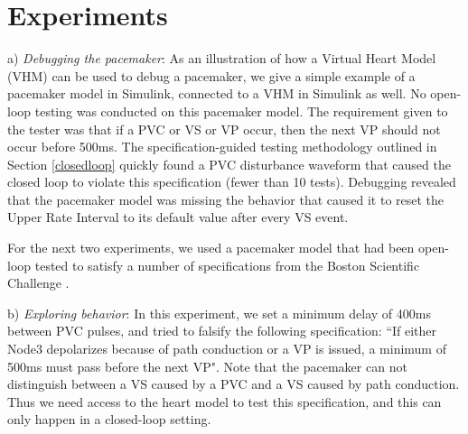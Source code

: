 \section{Experiments}
\label{experiments}

a) \emph{Debugging the pacemaker}: As an illustration of how a Virtual Heart Model (VHM) can be used to debug a pacemaker, we give a simple example of a pacemaker model in Simulink, connected to a VHM in Simulink as well. 
No open-loop testing was conducted on this pacemaker model.
The requirement given to the tester was that if a PVC or VS or VP occur, then the next VP should not occur before 500ms. 
The specification-guided testing methodology outlined in Section \ref{closedloop} quickly found a PVC disturbance waveform that caused the closed loop to violate this specification (fewer than 10 tests).
Debugging revealed that the pacemaker model was missing the behavior that caused it to reset the Upper Rate Interval to its default value after every VS event.

For the next two experiments, we used a pacemaker model that had been open-loop tested to satisfy a number of specifications from the Boston Scientific Challenge \cite{challenge}.

b) \emph{Exploring behavior}: In this experiment, we set a minimum delay of 400ms between PVC pulses, and tried to falsify the following specification:
``If either Node3 depolarizes because of path conduction or a VP is issued, a minimum of 500ms must pass before the next VP".
Note that the pacemaker can not distinguish between a VS caused by a PVC and a VS caused by path conduction.
Thus we need access to the heart model to test this specification, and this can only happen in a closed-loop setting.

